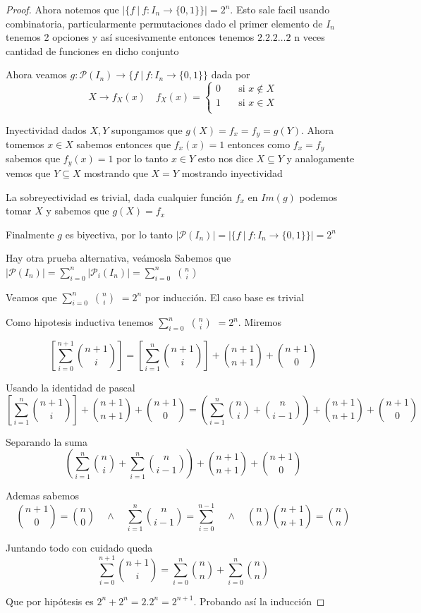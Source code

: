 \documentclass{article}
\theoremstyle{break}
\begin{document}
    \begin{proof}
        Ahora notemos que $|\{f \ |\  f: I_n \rightarrow \{0,1\}\}| = 2^n$. Esto sale facil usando combinatoria, particularmente permutaciones
        dado el primer elemento de $I_n$ tenemos 2 opciones y así sucesivamente entonces tenemos $2.2.2\ldots 2$ n veces cantidad de funciones 
        en dicho conjunto

        Ahora veamos $g: \mathcal{P}(I_n) \rightarrow \{f \ |\  f: I_n \rightarrow \{0,1\} \}$ dada por
        \[   
            X \rightarrow f_X(x) \quad f_X(x) =
            \begin{cases}
            0 &\quad\text{si } x \notin X \\
            1  &\quad\text{si } x \in X \\

            \end{cases}
        \]

        Inyectividad dados $X, Y$ supongamos que $g(X) = f_x = f_y = g(Y)$.  Ahora tomemos $x \in X$ sabemos entonces que $f_x(x) = 1 $
        entonces como $f_x = f_y$ sabemos que $f_y(x) = 1$ por lo tanto $x\in Y$ esto nos dice $X \subseteq Y$ y analogamente vemos que 
        $Y \subseteq X$ mostrando que $X=Y$ mostrando inyectividad

        La sobreyectividad es trivial, dada cualquier función $f_x$ en $Im(g)$ podemos tomar $X$ y sabemos que $g(X) = f_x$ 

        Finalmente $g$ es biyectiva, por lo tanto $|\mathcal{P}(I_n)| = |\{f \ |\  f: I_n \rightarrow \{0,1\}\}| = 2^n$

        Hay otra prueba alternativa, veámosla   
        Sabemos que $|\mathcal{P}(I_n)| = \sum_{i=0}^{n} |\mathcal{P}_{i}(I_n)| = \sum_{i=0}^n $ $\binom{n}{i}$  

        Veamos que $\sum_{i=0}^n $ $\binom{n}{i}$   $= 2^n$ por inducción. El caso base es trivial

        Como hipotesis inductiva tenemos $\sum_{i=0}^n $ $\binom{n}{i}$   $= 2^n$. Miremos 

	\[ \left[\sum_{i=0}^{n+1} \binom{n+1}{i}\right]   = [\sum_{i=1}^n  \binom{n+1}{i}] + \binom{n+1}{n+1}   + \binom{n+1}{0} \]  

        Usando la identidad de pascal \[\left[\sum_{i=1}^n \binom{n+1}{i}  \right] + \binom{n+1}{n+1}   +\binom{n+1}{0}   = 
	\left(\sum_{i=1}^n  \binom{n}{i} + \binom{n}{i-1} \right)+ \binom{n+1}{n+1} + \binom{n+1}{0} \]

	Separando la suma \[ \left(\sum_{i=1}^n  \binom{n}{i} + \sum_{i=1}^n  \binom{n}{i-1} \right)+ \binom{n+1}{n+1} + \binom{n+1}{0} \]
	
	Ademas sabemos \[ \binom{n+1}{0}  =\binom{n}{0} \quad \land \quad \sum_{i=1}^n  \binom{n}{i-1}  = \sum_{i=0}^{n-1} \quad\land\quad  \binom{n}{n}  
	 \binom{n+1}{n+1} = \binom{n}{n} \]
        
	Juntando todo con cuidado queda 
	\[\sum_{i=0}^{n+1}  \binom{n+1}{i} = \sum_{i=0}^n  \binom{n}{n}   + \sum_{i=0}^n  \binom{n}{n} \] 
	
	Que por hipótesis es $2^n +2^n = 2.2^n = 2^{n+1}$. Probando así la inducción
    \end{proof}
\end{document}
